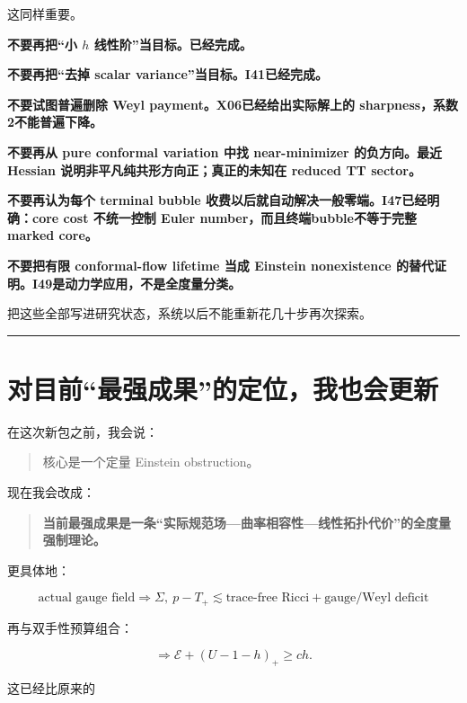 \documentclass[
  10pt,
]{article}
\begin{document}
这同样重要。

\textbf{不要再把``小 \(h\) 线性阶''当目标。已经完成。}

\textbf{不要再把``去掉 scalar variance''当目标。I41已经完成。}

\textbf{不要试图普遍删除 Weyl payment。X06已经给出实际解上的
sharpness，系数2不能普遍下降。}

\textbf{不要再从 pure conformal variation 中找 near-minimizer
的负方向。最近 Hessian 说明非平凡纯共形方向正；真正的未知在 reduced TT
sector。}

\textbf{不要再认为每个 terminal bubble
收费以后就自动解决一般零端。I47已经明确：core cost 不统一控制 Euler
number，而且终端bubble不等于完整marked core。}

\textbf{不要把有限 conformal-flow lifetime 当成 Einstein nonexistence
的替代证明。I49是动力学应用，不是全度量分类。}

把这些全部写进研究状态，系统以后不能重新花几十步再次探索。

\begin{center}\rule{0.5\linewidth}{0.5pt}\end{center}

\hypertarget{ux5bf9ux76eeux524dux6700ux5f3aux6210ux679cux7684ux5b9aux4f4dux6211ux4e5fux4f1aux66f4ux65b0}{%
\section{对目前``最强成果''的定位，我也会更新}\label{ux5bf9ux76eeux524dux6700ux5f3aux6210ux679cux7684ux5b9aux4f4dux6211ux4e5fux4f1aux66f4ux65b0}}

在这次新包之前，我会说：

\begin{quote}
核心是一个定量 Einstein obstruction。
\end{quote}

现在我会改成：

\begin{quote}
\textbf{当前最强成果是一条``实际规范场---曲率相容性---线性拓扑代价''的全度量强制理论。}
\end{quote}

更具体地：

\[
\boxed{
\text{actual gauge field}
\Longrightarrow
\Sigma,\ p-T_+
\lesssim
\text{trace-free Ricci}
+
\text{gauge/Weyl deficit}
}
\]

再与双手性预算组合：

\[
\Longrightarrow
\boxed{
\mathcal E+(U-1-h)_+\ge ch.
}
\]

这已经比原来的
\end{document}
